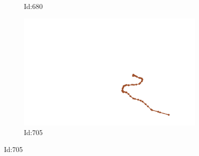 \documentclass[12pt,twoside]{report}
\begin{document}
\begin{figure}
\begin{subfigure}[b]{0.20\textwidth}
\caption{Id:680}
\end{subfigure}
\begin{subfigure}[b]{0.20\textwidth}
\centering
\includegraphics[width=\textwidth]{../../trajectories/705.png}
\caption{Id:705}
\end{subfigure}
\end{figure}
\end{document}
